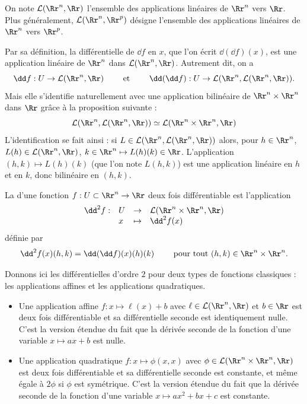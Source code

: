 On note $\mathcal{L}(\Rr^n,\Rr)$ l'ensemble des applications linéaires de $\Rr^n$ vers $\Rr$.
Plus généralement, $\mathcal{L}(\Rr^n,\Rr^p)$ désigne l'ensemble des applications linéaires de $\Rr^n$ vers $\Rr^p$.

Par sa définition, la différentielle de $\dd f$ en $x$, que l'on écrit $\dd(\dd f)(x)$, est une application linéaire de $\Rr^n$ dans $\mathcal{L}(\Rr^n,\Rr)$. Autrement dit, on a
$$
\dd f : U \to \mathcal{L}(\Rr^n,\Rr) 
\qquad \text{ et } \qquad
\dd (\dd f) : U \to \mathcal{L} (\Rr^n,\mathcal{L}(\Rr^n,\Rr)).
$$
Mais elle s'identifie naturellement avec une application 
bilinéaire de $\Rr^n \times \Rr^n$ dans $\Rr$ grâce à la proposition suivante :
$$\mathcal{L} (\Rr^n,\mathcal{L}(\Rr^n,\Rr)) \simeq 
\mathcal{L} (\Rr^n \times \Rr^n,\Rr)$$
L'identification se fait ainsi : 
si $L \in \mathcal{L} (\Rr^n,\mathcal{L}(\Rr^n,\Rr))$
alors, pour $h \in \Rr^n$, $L(h) \in \mathcal{L}(\Rr^n,\Rr)$, $k \in \Rr^n \mapsto L(h)(k) \in \Rr$.
L'application $(h,k) \mapsto L(h)(k)$ (que l'on note $L(h,k)$) est une application linéaire en $h$ et en $k$, donc bilinéaire en $(h,k)$.

\begin{definition}{}{}
La  d'une fonction $f: U \subset \Rr^n \to \Rr$ deux fois différentiable est l'application
$$\begin{array}{clll}
\dd^2 f : & U & \rightarrow & \mathcal{L}(\Rr^n \times \Rr^n,\Rr) \\
          & x & \mapsto & \dd^2 f(x)
\end{array}$$
définie par
$$\dd^2f(x)(h,k) = \dd(\dd f)(x)(h)(k) \qquad \text{ pour tout } (h,k)\in \Rr^n \times \Rr^n.$$
\end{definition}

Donnons ici les différentielles d'ordre $2$ pour deux types de fonctions classiques : les applications affines et les applications quadratiques. 
\begin{itemize}
    \item Une application affine $f : x \mapsto \ell(x)+b$ avec $\ell \in \mathcal{L}(\Rr^n,\Rr)$ et $b \in \Rr$
    est deux fois différentiable et sa différentielle seconde est identiquement nulle.
    C'est la version étendue du fait que la dérivée seconde de la fonction d'une variable $x \mapsto ax+b$ est nulle.
    
    \item Une application quadratique $f: x \mapsto \phi(x,x)$ avec $\phi \in \mathcal{L}(\Rr^n \times \Rr^n, \Rr)$
    est deux fois différentiable et sa différentielle seconde est constante, et même égale à $2\phi$ si $\phi$ est symétrique.
    C'est la version étendue du fait que la dérivée seconde de la fonction d'une variable $x \mapsto ax^2+bx+c$ est constante.
\end{itemize}

